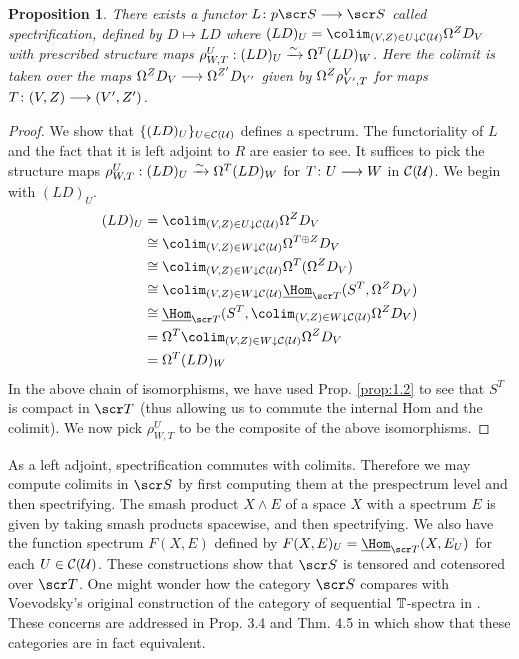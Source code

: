 \documentclass{amsart}
\newtheorem{prop}{Proposition}[section]
\theoremstyle{definition}
\begin{document}
\begin{prop}\label{prop:2.1}
There exists a functor $L \colon p \sS \rtarr \sS$ called spectrification, defined by $D \mapsto LD$ where $(LD)_U = \colim_{(V,Z) \in U \downarrow \oC(\oU)} \OM^Z D_V$ with prescribed structure maps $\rho^{U}_{W,T} : (LD)_U \xrightarrow{\sim} \Omega^T (LD)_W$. Here the colimit is taken over the maps $\Omega^Z D_V \longrightarrow \Omega^{Z'}D_{V'}$ given by $\Omega^{Z}\rho^{V}_{V', T}$ for maps $T \colon (V,Z) \longrightarrow (V',Z')$. 
\end{prop}

\begin{proof}
We show that $\{(LD)_U\}_{U \in {\mathcal{C}}({\mathcal{U}})}$ defines a spectrum. The functoriality of $L$ and the fact that it is left adjoint to $R$ are easier to see. It suffices to pick the structure maps $\rho^{U}_{W,T} : (LD)_U \xrightarrow{\sim} \Omega^T (LD)_W$ for $T \colon U \longrightarrow W$ in ${\mathcal{C}}({\mathcal{U}})$. We begin with $(LD)_U$. 
\begin{equation*}
\begin{split}
(LD)_U &= \colim_{(V,Z) \in U \downarrow \oC(\oU)} \OM^Z D_V\\
&\iso \colim_{(V,Z) \in W \downarrow \oC(\oU)} \OM^{T \oplus Z} D_V\\
&\iso \colim_{(V,Z) \in W \downarrow \oC(\oU)} \OM^T(\OM^Z D_V)\\
&\iso \colim_{(V,Z) \in W \downarrow \oC(\oU)} \underline{\Hom}_{\sT}(S^T,\OM^Z D_V)\\ 
&\iso \underline{\Hom}_{\sT}(S^T, \colim_{(V,Z) \in W \downarrow \oC(\oU)} \OM^Z D_V)\\
&= \OM^T \colim_{(V,Z) \in W \downarrow \oC(\oU)} \OM^Z D_V\\
&= \OM^T(LD)_W
\end{split}
\end{equation*}
In the above chain of isomorphisms, we have used Prop. \ref{prop:1.2} to see that $S^T$ is compact in $\sT$ (thus allowing us to commute the internal Hom and the colimit). We now pick $\rho^{U}_{W,T}$ to be the composite of the above isomorphisms. 
\end{proof}

\noindent As a left adjoint, spectrification commutes with colimits. Therefore we may compute colimits in $\sS$ by first computing them at the prespectrum level and then spectrifying. The smash product $X \wedge E$ of a space $X$ with a spectrum $E$ is given by taking smash products spacewise, and then spectrifying. We also have the function spectrum $F(X,E)$ defined by $F(X,E)_U = \underline{\Hom}_{\sT} (X,E_U)$ for each $U \in {\mathcal{C}}({\mathcal{U}})$. These constructions show that $\sS$ is tensored and cotensored over $\sT$. One might wonder how the category $\sS$ compares with Voevodsky's original construction of the category of sequential $\mathbb{T}$-spectra in \cite{voev96pre}. These concerns are addressed in Prop. 3.4 and Thm. 4.5 in \cite{Hu03} which show that these categories are in fact equivalent.\\
\end{document}
